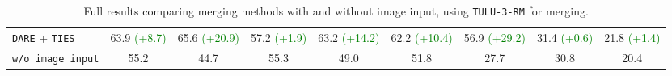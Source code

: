 \begin{table*}[hbtp]
{\begin{tabular}{l c c c c c c c c}
            \midrule
            \texttt{DARE} + \texttt{TIES}      & 63.9 \textcolor{Green}{(+8.7)} & 65.6 \textcolor{Green}{(+20.9)} & 57.2 \textcolor{Green}{(+1.9)} & 63.2 \textcolor{Green}{(+14.2)} & 62.2 \textcolor{Green}{(+10.4)} & 56.9 \textcolor{Green}{(+29.2)} & 31.4 \textcolor{Green}{(+0.6)} & 21.8 \textcolor{Green}{(+1.4)} \\
            \texttt{w/o image input}           & 55.2 & 44.7 & 55.3 & 49.0 & 51.8 & 27.7 & 30.8 & 20.4 \\
            \bottomrule
        \end{tabular}
    }
    \caption{Full results comparing merging methods with and without image input, using \texttt{TULU-3-RM} for merging.}
    \label{tab:cmp_image_full_tulu3}
\end{table*}